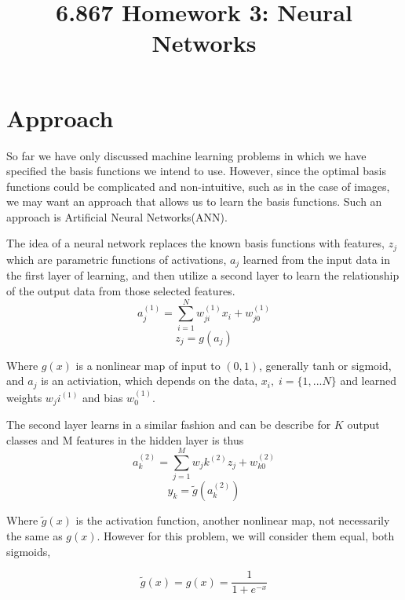 \documentclass[12pt, twocolumn]{article}
\begin{document}
\title{6.867 Homework 3: Neural Networks}
\maketitle

\section{Approach}
So far we have only discussed machine learning problems in which we have specified the basis functions we intend to use. However, since the optimal basis functions could be complicated and non-intuitive, such as in the case of images, we may want an approach that allows us to learn the basis functions. Such an approach is Artificial Neural Networks(ANN). 

The idea of a neural network replaces the known basis functions with features, $z_j$ which are parametric functions of activations, $a_j$ learned from the input data in the first layer of learning, and then utilize a second layer to learn the relationship of the output data from those selected features. 
\begin{equation}
a_j^{(1)}= \sum_{i=1}^N w_{ji}^{(1)} x_i+w_{j0}^{(1)}
\end{equation}
\begin{equation}
z_j= g(a_j)
\end{equation}

Where $g(x)$ is a nonlinear map of input to $(0,1)$, generally tanh or sigmoid, and $a_j$ is an activiation, which depends on the data, $x_i, \; i=\{1,...N\}$  and learned weights $w_ji^{(1)}$ and bias $w_0^{(1)}$. 

The second layer learns in a similar fashion and can be describe for $K$ output classes and M features in the  hidden layer  is thus 
\begin{equation}
a_k^{(2)}= \sum_{j=1}^M w_jk^{(2)} z_j+w_{k0}^{(2)}
\end{equation}
\begin{equation}
y_k= \tilde{g}(a_k^{(2)})
\end{equation}
 
Where $\tilde{g}(x)$ is the activation function, another nonlinear map, not necessarily the same as $g(x)$. However for this problem, we will consider them equal, both sigmoids, 

\begin{equation}
\tilde{g}(x)= g(x) = \frac{1}{ 1+e^{-x}}
\end{equation}
\end{document}
